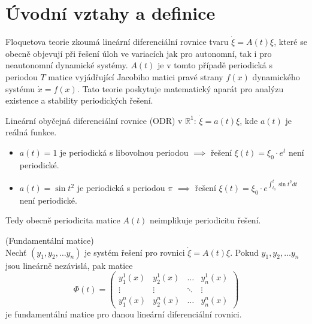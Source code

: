 \section{Úvodní vztahy a definice}\label{sec:uvod}

Floquetova teorie zkoumá lineární diferenciální rovnice tvaru  $\dot{\xi } = A(t) \xi$, které se obecně objevují při řešení úloh ve variacích jak pro autonomní, tak i pro neautonomní dynamické systémy. $A(t)$ je v tomto případě periodická s periodou $T$ matice vyjádřující Jacobiho matici pravé strany $f(x)$ dynamického systému $\dot{x} = f(x)$.  Tato teorie poskytuje matematický aparát pro analýzu existence a stability periodických řešení.

\medskip

\begin{exmp}
	Lineární obyčejná diferenciální rovnice (ODR) v $\mathbb{R}^{1}$: $\dot{\xi} = a(t)  \xi$, kde $a(t)$ je reálná funkce.
	
	\begin{itemize}
		\item $a(t) = 1$ je periodická s libovolnou periodou $\implies$ řešení $\xi(t) = \xi_{0} \cdot e^{t}$ není  periodické.
		\item $a(t) = \sin t^{2}$ je periodická s periodou $\pi$ $\implies$ řešení $\xi(t) = \xi_{0} \cdot e^{ \int_{t_{0}}^{t} \sin t^{2} dt }$ není periodické.
	\end{itemize}

	Tedy obecně periodicita matice $A(t)$ neimplikuje periodicitu řešení.
\end{exmp}

\medskip

\begin{defn} (Fundamentální matice) \\
	Nechť $(y_{1}, y_{2}, \dots y_{n})$ je systém řešení pro rovnici $\dot{\xi } = A(t) \xi$. Pokud $y_{1}, y_{2}, \dots y_{n}$ jsou lineárně nezávislá, pak matice 
	\begin{equation}
		\Phi(t) = 
		\begin{pmatrix} 
			y_{1}^{1}(x) & y_{2}^{1}(x) & \dots  & y_{n}^{1}(x) \\ 
			\vdots &  \vdots & \ddots & \vdots \\ 
			y_{1}^{n}(x) & y_{2}^{n}(x) & \dots & y_{n}^{n}(x) 
		\end{pmatrix} 
	\end{equation}
	je fundamentální matice pro danou lineární diferenciální rovnici.
\end{defn}

